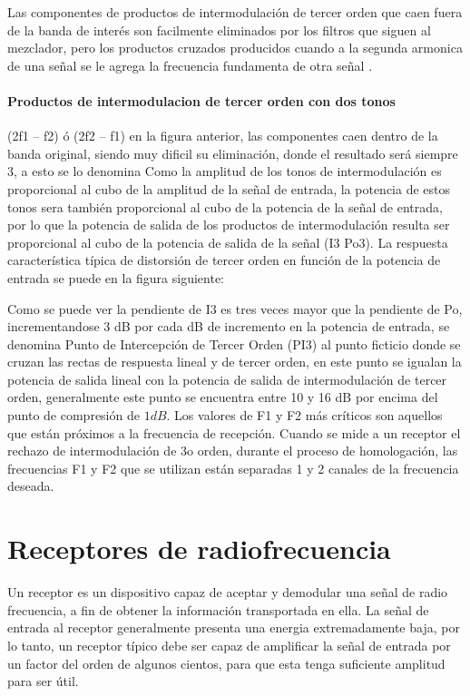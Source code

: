 \documentclass[letterpaper,10pt,spanish]{sphinxmanual}
\let\sphinxpxdimen\pdfpxdimen\else\newdimen\sphinxpxdimen
\begin{document}
Las componentes de productos de intermodulación de tercer orden que caen fuera de la banda de interés son facilmente eliminados por los filtros que siguen al mezclador, pero los productos cruzados producidos cuando a la segunda armonica de una señal se le agrega la frecuencia fundamenta de otra señal .


\subsubsection{Productos de intermodulacion de tercer orden con dos tonos}
\label{\detokenize{introduccion/sistemas:Productos-de-intermodulacion-de-tercer-orden-con-dos-tonos}}
(2f1 – f2) ó (2f2 – f1) en la figura anterior, las componentes caen dentro de la banda original, siendo muy dificil su eliminación, donde el resultado será siempre 3, a esto se lo denomina Como la amplitud de los tonos de intermodulación es proporcional al cubo de la amplitud de la señal de entrada, la potencia de estos tonos sera también proporcional al cubo de la potencia de la señal de entrada, por lo que la potencia de salida de los productos de intermodulación resulta ser proporcional al
cubo de la potencia de salida de la señal (I3 Po3). La respuesta característica típica de distorsión de tercer orden en función de la potencia de entrada se puede en la figura siguiente:

\sphinxincludegraphics[width=1067\sphinxpxdimen,height=567\sphinxpxdimen]{{linealidad2}.png}

Como se puede ver la pendiente de I3 es tres veces mayor que la pendiente de Po, incrementandose 3 dB por cada dB de incremento en la potencia de entrada, se denomina Punto de Intercepción de Tercer Orden (PI3) al punto ficticio donde se cruzan las rectas de respuesta lineal y de tercer orden, en este punto se igualan la potencia de salida lineal con la potencia de salida de intermodulación de tercer orden, generalmente este punto se encuentra entre 10 y 16 dB por encima del punto de compresión
de \(1 dB\). Los valores de F1 y F2 más críticos son aquellos que están próximos a la frecuencia de recepción. Cuando se mide a un receptor el rechazo de intermodulación de 3o orden, durante el proceso de homologación, las frecuencias F1 y F2 que se utilizan están separadas 1 y 2 canales de la frecuencia deseada.


\chapter{Receptores de radiofrecuencia}
\label{\detokenize{introduccion/sistemas:Receptores-de-radiofrecuencia}}
Un receptor es un dispositivo capaz de aceptar y demodular una señal de radio frecuencia, a fin de obtener la información transportada en ella. La señal de entrada al receptor generalmente presenta una energia extremadamente baja, por lo tanto, un receptor típico debe ser capaz de amplificar la señal de entrada por un factor del orden de algunos cientos, para que esta tenga suficiente amplitud para ser útil.
\end{document}
